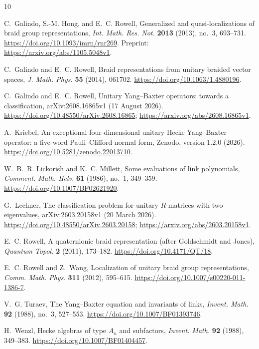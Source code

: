 \documentclass[11pt]{article}
\theoremstyle{remark}
\begin{document}
\begin{thebibliography}{10}

C.~Galindo, S.-M. Hong, and E.~C. Rowell,
\newblock Generalized and quasi-localizations of braid group representations,
\newblock \emph{Int. Math. Res. Not.} \textbf{2013} (2013), no.~3, 693--731.
\newblock \url{https://doi.org/10.1093/imrn/rnr269}.
\newblock Preprint: \url{https://arxiv.org/abs/1105.5048v1}.

C.~Galindo and E.~C. Rowell,
\newblock Braid representations from unitary braided vector spaces,
\newblock \emph{J. Math. Phys.} \textbf{55} (2014), 061702.
\newblock \url{https://doi.org/10.1063/1.4880196}.

C.~Galindo and E.~C. Rowell,
\newblock Unitary Yang--Baxter operators: towards a classification,
\newblock arXiv:2608.16865v1 (17 August 2026).
\newblock \url{https://doi.org/10.48550/arXiv.2608.16865};
\url{https://arxiv.org/abs/2608.16865v1}.

A.~Kriebel,
\newblock An exceptional four-dimensional unitary Hecke Yang--Baxter operator:
a five-word Pauli--Clifford normal form,
\newblock Zenodo, version 1.2.0 (2026).
\newblock \url{https://doi.org/10.5281/zenodo.22013710}.

W.~B.~R. Lickorish and K.~C. Millett,
\newblock Some evaluations of link polynomials,
\newblock \emph{Comment. Math. Helv.} \textbf{61} (1986), no.~1, 349--359.
\newblock \url{https://doi.org/10.1007/BF02621920}.

G.~Lechner,
\newblock The classification problem for unitary \(R\)-matrices with two
eigenvalues,
\newblock arXiv:2603.20158v1 (20 March 2026).
\newblock \url{https://doi.org/10.48550/arXiv.2603.20158};
\url{https://arxiv.org/abs/2603.20158v1}.

E.~C. Rowell,
\newblock A quaternionic braid representation (after Goldschmidt and Jones),
\newblock \emph{Quantum Topol.} \textbf{2} (2011), 173--182.
\newblock \url{https://doi.org/10.4171/QT/18}.

E.~C. Rowell and Z.~Wang,
\newblock Localization of unitary braid group representations,
\newblock \emph{Comm. Math. Phys.} \textbf{311} (2012), 595--615.
\newblock \url{https://doi.org/10.1007/s00220-011-1386-7}.

V.~G. Turaev,
\newblock The Yang--Baxter equation and invariants of links,
\newblock \emph{Invent. Math.} \textbf{92} (1988), no.~3, 527--553.
\newblock \url{https://doi.org/10.1007/BF01393746}.

H.~Wenzl,
\newblock Hecke algebras of type \(A_n\) and subfactors,
\newblock \emph{Invent. Math.} \textbf{92} (1988), 349--383.
\newblock \url{https://doi.org/10.1007/BF01404457}.

\end{thebibliography}
\end{document}
